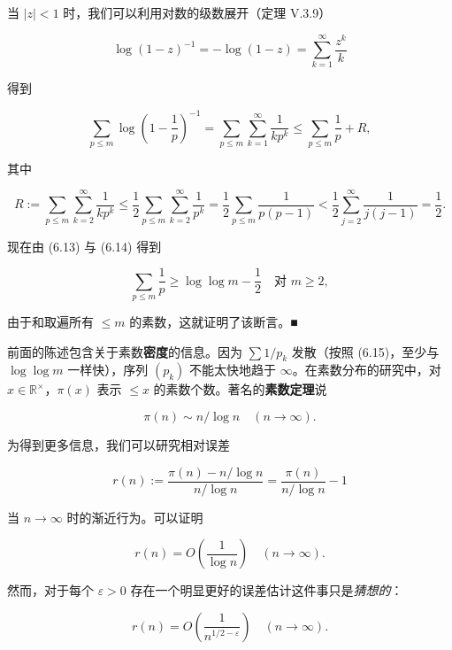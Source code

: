 \begin{remark}
当 $ |z| < 1 $ 时，我们可以利用对数的级数展开（定理 V.3.9）

\[
\log(1 - z)^{-1} = -\log(1 - z) = \sum_{k=1}^{\infty}\frac{z^k}{k}
\]

得到

\begin{equation}
\sum_{p\le m}\log\left( 1 - \frac{1}{p} \right)^{-1} = \sum_{p\le m}\sum_{k=1}^{\infty}\frac{1}{kp^k} \le \sum_{p\le m}\frac{1}{p} + R ,\tag{6.14}
\end{equation}

其中

\[
R := \sum_{p\le m}\sum_{k=2}^{\infty}\frac{1}{kp^k} \le \frac{1}{2}\sum_{p\le m}\sum_{k=2}^{\infty}\frac{1}{p^k} = \frac{1}{2}\sum_{p\le m}\frac{1}{p(p - 1)} < \frac{1}{2}\sum_{j=2}^{\infty}\frac{1}{j(j - 1)} = \frac{1}{2} .
\]

现在由 (6.13) 与 (6.14) 得到

\begin{equation}
\sum_{p\le m}\frac{1}{p} \ge \log\log m - \frac{1}{2} \quad \text{对 } m \ge 2 ,\tag{6.15}
\end{equation}

由于和取遍所有 $ \le m $ 的素数，这就证明了该断言。\nobreak\hspace{0.35em}■

\begin{items}
\item[（e）]

前面的陈述包含关于素数\textbf{密度}的信息。因为 $ \sum 1/p_k $ 发散（按照 (6.15)，至少与 $ \log\log m $ 一样快），序列 $ (p_k) $ 不能太快地趋于 $ \infty $。在素数分布的研究中，对 $ x \in \mathbb{R}^\times $，$ \pi(x) $ 表示 $ \le x $ 的素数个数。著名的\textbf{素数定理}说

\[
\pi(n) \sim n/\log n \quad (n \to \infty) .
\]

为得到更多信息，我们可以研究相对误差

\[
r(n) := \frac{\pi(n) - n/\log n}{n/\log n} = \frac{\pi(n)}{n/\log n} - 1
\]

当 $ n \to \infty $ 时的渐近行为。可以证明

\[
r(n) = O\left( \frac{1}{\log n} \right) \quad (n \to \infty) .
\]

然而，对于每个 $ \varepsilon > 0 $ 存在一个明显更好的误差估计这件事只是\emph{猜想的}：

\[
r(n) = O\left( \frac{1}{n^{1/2-\varepsilon}} \right) \quad (n \to \infty) .
\]


\end{items}
\end{remark}
